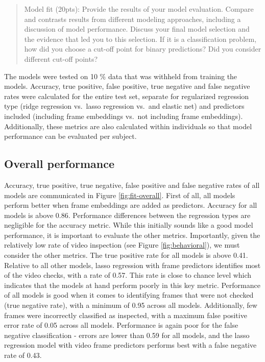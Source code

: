 \documentclass[
  man,floatsintext]{apa6}
\begin{document}
\begin{quote}
Model fit (20pts): Provide the results of your model evaluation. Compare and contrasts results from different modeling approaches, including a discussion of model performance. Discuss your final model selection and the evidence that led you to this selection. If it is a classification problem, how did you choose a cut-off point for binary predictions? Did you consider different cut-off points?
\end{quote}

The models were tested on 10 \% data that was withheld from training the models. Accuracy, true positive, false positive, true negative and false negative rates were calculated for the entire test set, separate for regularized regression type (ridge regression vs.~lasso regression vs.~and elastic net) and predictors included (including frame embeddings vs.~not including frame embeddings). Additionally, these metrics are also calculated within individuals so that model performance can be evaluated per subject.

\hypertarget{overall-performance}{%
\subsection{Overall performance}\label{overall-performance}}

Accuracy, true positive, true negative, false positive and false negative rates of all models are communicated in Figure \ref{fig:fit-overall}. First of all, all models perform better when frame embeddings are added as predictors. Accuracy for all models is above 0.86. Performance differences between the regression types are negligible for the accuracy metric. While this initially sounds like a good model performance, it is important to evaluate the other metrics. Importantly, given the relatively low rate of video inspection (see Figure \ref{fig:behavioral}), we must consider the other metrics. The true positive rate for all models is above 0.41. Relative to all other models, lasso regression with frame predictors identifies most of the video checks, with a rate of 0.57. This rate is close to chance level which indicates that the models at hand perform poorly in this key metric. Performance of all models is good when it comes to identifying frames that were not checked (true negative rate), with a minimum of 0.95 across all models. Additionally, few frames were incorrectly classified as inspected, with a maximum false positive error rate of 0.05 across all models. Performance is again poor for the false negative classification - errors are lower than 0.59 for all models, and the lasso regression model with video frame predictors performs best with a false negative rate of 0.43.
\end{document}
